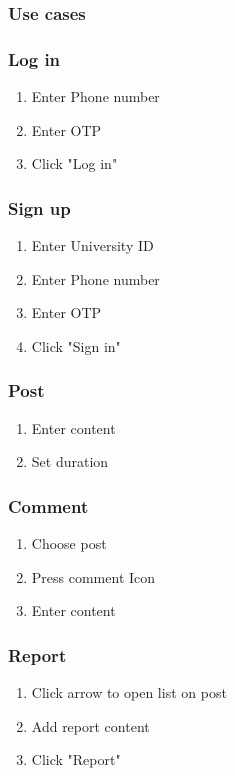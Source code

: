 \documentclass[12pt]{article}
\begin{document}
\subsubsection{Use cases}
\subsubsection*{Log in}
\begin{enumerate}
\itemsep0em
\item Enter Phone number
\item Enter OTP
\item Click "Log in"
\end{enumerate}
\subsubsection*{Sign up}
\begin{enumerate}
\itemsep0em 
\item Enter University ID
\item Enter Phone number
\item Enter OTP
\item Click "Sign in"

\end{enumerate}
\subsubsection*{Post}
\begin{enumerate}
\itemsep0em 
\item Enter content
\item Set duration
\end{enumerate} 
\subsubsection*{Comment}
\begin{enumerate}
\itemsep0em 
\item Choose post
\item Press comment Icon
\item Enter content
\end{enumerate} 
\subsubsection*{Report}
\begin{enumerate}
\itemsep0em 
\item Click arrow to open list on post
\item Add report content
\item Click "Report"
\end{enumerate} 
\end{document}
